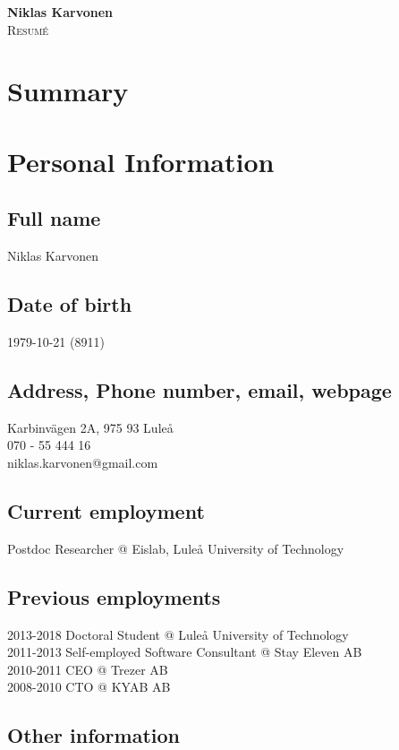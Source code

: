 \documentclass{article}
\makeatletter
\newlength\drop
\newcommand*\titleM{\begingroup%
\setlength\drop{0.08\textheight}
\centering
\vspace*{\drop}
{\Huge\bfseries Niklas Karvonen}\\[\baselineskip]
{\scshape Resumé}\\[\baselineskip]
\vfill
{\large\scshape }\par
\vfill
{\scshape \@date}\par
\vspace*{2\drop}
\endgroup}
\makeatother
\begin{document}
\begin{titlingpage}
\titleM
\end{titlingpage}
\newpage

\tableofcontents
\newpage

\section{Summary}


\section{Personal Information}


\subsection{Full name} Niklas Karvonen  \\
\subsection{Date of birth} 1979-10-21 (8911) \\
\subsection{Address, Phone number, email, webpage}
Karbinvägen 2A, 975 93 Luleå \\
070 - 55 444 16 \\ 
niklas.karvonen@gmail.com \\

\subsection{Current employment} Postdoc Researcher @ Eislab, Luleå University of Technology \\
\subsection{Previous employments}
2013-2018 Doctoral Student @ Luleå University of Technology \\
2011-2013 Self-employed Software Consultant @ Stay Eleven AB \\
2010-2011 CEO @ Trezer AB \\
2008-2010 CTO @ KYAB AB \\

\subsection{Other information}
\end{document}
